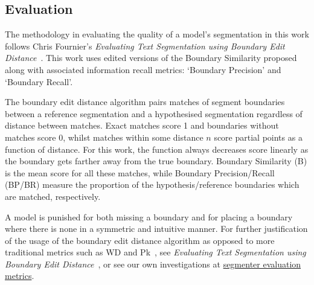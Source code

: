 \subsection{Evaluation}

The methodology in evaluating the quality of a model’s segmentation in this work follows Chris Fournier's \emph{Evaluating Text Segmentation using Boundary Edit Distance}~\cite{fournier-2013-B}. This work uses edited versions of the Boundary Similarity proposed along with associated information recall metrics: `Boundary Precision’ and ‘Boundary Recall’. 

The boundary edit distance algorithm pairs matches of segment boundaries between a reference segmentation and a hypothesised segmentation regardless of distance between matches. Exact matches score 1 and boundaries without matches score 0, whilst matches within some distance $n$ score partial points as a function of distance. For this work, the function always decreases score linearly as the boundary gets farther away from the true boundary. Boundary Similarity (B) is the mean score for all these matches, while Boundary Precision/Recall (BP/BR) measure the proportion of the hypothesis/reference boundaries which are matched, respectively. 

A model is punished for both missing a boundary and for placing a boundary where there is none in a symmetric and intuitive manner. For further justification of the usage of the boundary edit distance algorithm as opposed to more traditional metrics such as WD and Pk~\cite{HearstW2002}, see \emph{Evaluating Text Segmentation using Boundary Edit Distance}~\cite{fournier-2013-B}, or see our own investigations at \href{https://github.com/PierreRL/segmenter-evaluation-metrics}{segmenter evaluation metrics}.